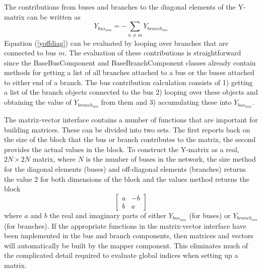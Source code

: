 \documentclass{acm_proc_article-sp}
\begin{document}
The contributions from buses and branches to the diagonal elements of the Y-matrix
can be written as
\begin{equation}
\label{yoffdiag}
Y_{bus_{mm}} = -\sum_{n\ne m}Y_{branch_{mn}}
\end{equation}
Equation (\ref{yoffdiag}) can be evaluated by looping over branches
that are connected to bus $m$. The evaluation of these contributions is
straightforward since the BaseBusComponent and BaseBranchComponent classes already contain
methods for getting a list of all branches attached to a bus or the buses
attached to either end of a branch. The bus contribution calculation consists of
1) getting a list of the branch objects connected to the bus 2) looping over
these objects and obtaining the value of $Y_{branch_{mn}}$ from them and
3) accumulating these into $Y_{bus_{mm}}$.

The matrix-vector interface contains a number of functions that are important
for building matrices. These can be divided into two sets. The first reports
back on the size of the block that the bus or branch contributes to the matrix,
the second provides the actual values in the block. To construct the Y-matrix as
a real, $2N\times 2N$ matrix, where $N$ is the number of buses in the network,
the size method for the diagonal elements (buses) and off-diagonal elements
(branches) returns the value 2 for both dimensions of the block and the values
method returns the block
\begin{equation}
\nonumber
\left[ \begin{array}{rr} a & -b \\ b & a\end{array} \right]
\end{equation}
where $a$ and $b$ the real and imaginary parts of either $Y_{bus_{mm}}$ (for
buses) or $Y_{branch_{mn}}$ (for branches). If the appropriate functions in the
matrix-vector interface have been implemented in the bus and branch components,
then matrices and vectors will automatically be built by the mapper component.
This eliminates much of the complicated detail required to evaluate global
indices when setting up a matrix.
\end{document}
